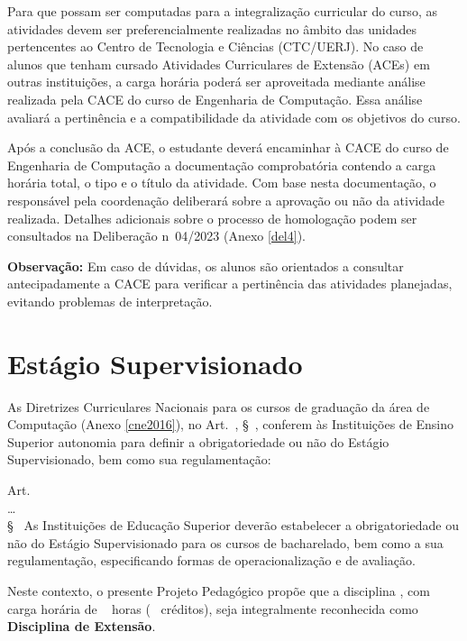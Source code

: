 Para que possam ser computadas para a integralização curricular do curso, as atividades devem ser preferencialmente realizadas no âmbito das unidades pertencentes ao Centro de Tecnologia e Ciências (CTC/UERJ). No caso de alunos que tenham cursado Atividades Curriculares de Extensão (ACEs) em outras instituições, a carga horária poderá ser aproveitada mediante análise realizada pela CACE do curso de Engenharia de Computação. Essa análise avaliará a pertinência e a compatibilidade da atividade com os objetivos do curso.

Após a conclusão da ACE, o estudante deverá encaminhar à CACE do curso de Engenharia de Computação a documentação comprobatória contendo a carga horária total, o tipo e o título da atividade. Com base nesta documentação, o responsável pela coordenação deliberará sobre a aprovação ou não da atividade realizada. Detalhes adicionais sobre o processo de homologação podem ser consultados na Deliberação n\textordmasculine~04/2023 (Anexo \ref{del4}).

\textbf{Observação:} Em caso de dúvidas, os alunos são orientados a consultar antecipadamente a CACE para verificar a pertinência das atividades planejadas, evitando problemas de interpretação.


\section{Estágio Supervisionado}
\label{sec:estagio-supervisionado-extensionista}
As Diretrizes Curriculares Nacionais para os cursos de graduação da área de Computação (Anexo \ref{cne2016}), no Art.~, \S~, conferem às Instituições de Ensino Superior autonomia para definir a obrigatoriedade ou não do Estágio Supervisionado, bem como sua regulamentação:

\begin{itquotation}
    \noindent Art.~\\
    \ldots\\
    \S~   As Instituições de Educação Superior deverão estabelecer a
    obrigatoriedade ou não do Estágio Supervisionado para os cursos de bacharelado, bem como a
    sua regulamentação, especificando formas de operacionalização e de avaliação.
\end{itquotation}

Neste contexto, o presente Projeto Pedagógico propõe que a disciplina \textbf{\EstSup}, com carga horária de \EstSupCH~ horas (\EstSupCred~  créditos), seja integralmente reconhecida como \textbf{Disciplina de Extensão}.


